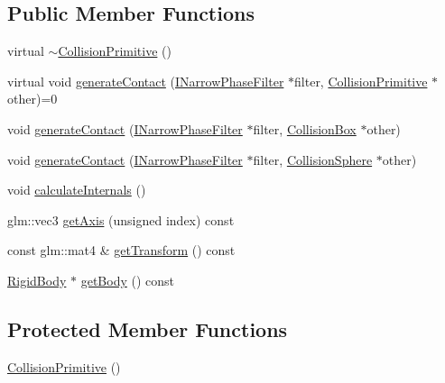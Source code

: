 \subsection*{Public Member Functions}
\begin{DoxyCompactItemize}
\item 
virtual \mbox{\hyperlink{classrum_1_1_collision_primitive_aaaa286303df8a1af561d698b4bb9f098}{$\sim$\+Collision\+Primitive}} ()
\item 
virtual void \mbox{\hyperlink{classrum_1_1_collision_primitive_a31af51e97485378954de219b8411a27d}{generate\+Contact}} (\mbox{\hyperlink{classrum_1_1_i_narrow_phase_filter}{I\+Narrow\+Phase\+Filter}} $\ast$filter, \mbox{\hyperlink{classrum_1_1_collision_primitive}{Collision\+Primitive}} $\ast$other)=0
\item 
void \mbox{\hyperlink{classrum_1_1_collision_primitive_afc7ac93a15b890539a4721638cbffe5a}{generate\+Contact}} (\mbox{\hyperlink{classrum_1_1_i_narrow_phase_filter}{I\+Narrow\+Phase\+Filter}} $\ast$filter, \mbox{\hyperlink{classrum_1_1_collision_box}{Collision\+Box}} $\ast$other)
\item 
void \mbox{\hyperlink{classrum_1_1_collision_primitive_a76af82066bef75988cce50fb3ac9e536}{generate\+Contact}} (\mbox{\hyperlink{classrum_1_1_i_narrow_phase_filter}{I\+Narrow\+Phase\+Filter}} $\ast$filter, \mbox{\hyperlink{classrum_1_1_collision_sphere}{Collision\+Sphere}} $\ast$other)
\item 
void \mbox{\hyperlink{classrum_1_1_collision_primitive_a422c1a39ca224b97e977022b5c781047}{calculate\+Internals}} ()
\item 
glm\+::vec3 \mbox{\hyperlink{classrum_1_1_collision_primitive_ad576d6ca6004b953fc7887b97856ee35}{get\+Axis}} (unsigned index) const
\item 
const glm\+::mat4 \& \mbox{\hyperlink{classrum_1_1_collision_primitive_a320a36ec6157bcdd373f40e5e9ab55d3}{get\+Transform}} () const
\item 
\mbox{\hyperlink{classrum_1_1_rigid_body}{Rigid\+Body}} $\ast$ \mbox{\hyperlink{classrum_1_1_collision_primitive_a36bb78c4a8e89c0000d91c228801e387}{get\+Body}} () const
\end{DoxyCompactItemize}
\subsection*{Protected Member Functions}
\begin{DoxyCompactItemize}
\item 
\mbox{\hyperlink{classrum_1_1_collision_primitive_af314a601d4528bc79710e9e7d9d0413e}{Collision\+Primitive}} ()
\end{DoxyCompactItemize}
